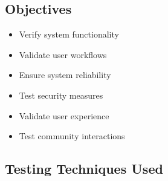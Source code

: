 \subsection{Objectives}
\begin{itemize}
    \item Verify system functionality
    \item Validate user workflows
    \item Ensure system reliability
    \item Test security measures
    \item Validate user experience
    \item Test community interactions
\end{itemize}

\subsection{Testing Techniques Used}

